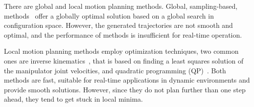 \documentclass[letterpaper, 10 pt, conference]{ieeeconf}  %
\begin{document}
%


There are global and local motion planning methods. Global, sampling-based, methods~\cite{vsvestka1997motion,lavalle1998rapidly, karaman2010incremental,kuffner2000rrt,gammell2015batch} offer a globally optimal solution based on a global search in configuration space. However, the generated trajectories are not smooth and optimal, and the performance of methods is insufficient for real-time operation.


Local motion planning methods employ optimization techniques, two common ones are inverse kinematics~\cite{c29,c38}, that is based on finding a least squares solution of the manipulator joint velocities, and quadratic programming (QP)~\cite{c21,c23}.  Both methods are fast, suitable for real-time applications in dynamic environments and provide smooth solutions. However, since they do not plan further than one step ahead, they tend to get stuck in local minima. 
\end{document}
